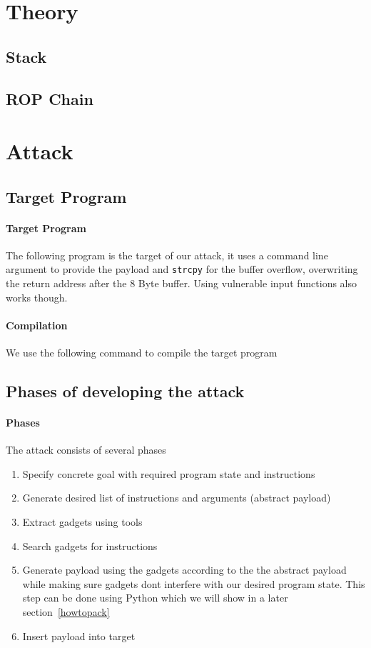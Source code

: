 \documentclass[journal=tosc,submission]{iacrtrans}
\begin{document}
\section{Theory}
\subsection{Stack}
\subsection{ROP Chain}
\section{Attack}
\subsection{Target Program}
\paragraph{Target Program}
The following program is the target of our attack, it uses a command line argument to provide the payload and \Verb+strcpy+ for the buffer overflow, overwriting the return address after the 8 Byte buffer. Using vulnerable input functions also works though.

\paragraph{Compilation}
We use the following command to compile the target program

\subsection{Phases of developing the attack}
\paragraph{Phases}
The attack consists of several phases
\begin{enumerate}
  \item Specify concrete goal with required program state and instructions
  \item Generate desired list of instructions and arguments (abstract payload)
  \item Extract gadgets using tools
  \item Search gadgets for instructions
  \item Generate payload using the gadgets according to the the abstract payload while making sure gadgets dont interfere with our desired program state. This step can be done using Python which we will show in a later section~\cref{howtopack}
  \item Insert payload into target
\end{enumerate}
\end{document}
